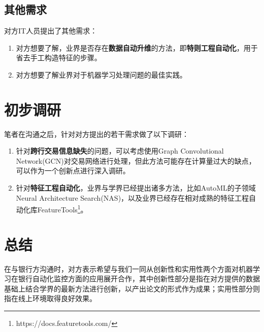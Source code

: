 \documentclass{article}
\begin{document}
\subsection{其他需求}
对方IT人员提出了其他需求：
\begin{enumerate}
    \item 对方想要了解，业界是否存在\textbf{数据自动升维}的方法，即\textbf{特则工程自动化}，用于省去手工构造特征的步骤。
    \item 对方想要了解业界对于机器学习处理问题的最佳实践。
\end{enumerate}

\section{初步调研}
笔者在沟通之后，针对对方提出的若干需求做了以下调研：
\begin{enumerate}
    \item 针对\textbf{跨行交易信息缺失}的问题，可以考虑使用Graph Convolutional Network(GCN)对交易网络进行处理，但此方法可能存在计算量过大的缺点，可以作为一个创新点进行深入调研。
    \item 针对\textbf{特征工程自动化}，业界与学界已经提出诸多方法，比如AutoML的子领域Neural Architecture Search(NAS)，以及业界已经存在相对成熟的特征工程自动化库FeatureTools\footnote{https://docs.featuretools.com/}。
\end{enumerate}

\section{总结}
在与银行方沟通时，对方表示希望与我们一同从创新性和实用性两个方面对机器学习在银行自动化监控方面的应用展开合作，其中创新性部分是指在对方提供的数据基础上结合学界的最新方法进行创新，以产出论文的形式作为成果；实用性部分则指在线上环境取得良好效果。
\end{document}
